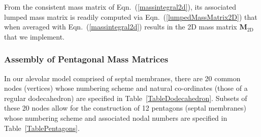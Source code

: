 From the consistent mass matrix of Eqn.~(\ref{massintegral2d}), its associated lumped mass matrix is readily computed via Eqn.~(\ref{lumpedMassMatrix2D}) that when averaged with Eqn.~(\ref{massintegral2d}) results in the 2D mass matrix $\mathbf{M}_{\mathrm{2D}}$ that we implement.

\subsubsection{Assembly of Pentagonal Mass Matrices}

In our alevolar model comprised of septal membranes, there are 20 common nodes (vertices) whose numbering scheme and natural co-ordinates (those of a regular dodecahedron) are specified in Table~\ref{TableDodecahedron}.  Subsets of these 20 nodes allow for the construction of 12 pentagons (septal membranes) whose numbering scheme and associated nodal numbers are specified in Table~\ref{TablePentagons}.

